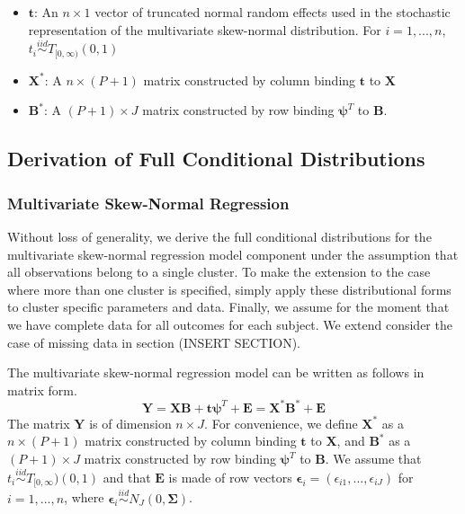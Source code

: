 \documentclass[useAMS,referee]{biom}
\begin{document}
\begin{itemize}
    \item $\mathbf{t}$: An $n \times 1$ vector of truncated normal random effects used in the stochastic representation of the multivariate skew-normal distribution. For $i = 1,...,n$, $t_i \stackrel{iid}{\sim}T_{[0,\infty)}(0,1)$
    
    \item $\mathbf{X}^*$: A $n \times (P + 1)$ matrix constructed by column binding $\mathbf{t}$ to $\mathbf{X}$
    
    \item $\mathbf{B}^*$: A $(P+1) \times J$ matrix constructed by row binding $\boldsymbol\psi^T$ to $\mathbf{B}$.

\end{itemize}

\newpage
\subsection{Derivation of Full Conditional Distributions}

\subsubsection{Multivariate Skew-Normal Regression}

Without loss of generality, we derive the full conditional distributions for the multivariate skew-normal regression model component under the assumption that all observations belong to a single cluster. To make the extension to the case where more than one cluster is specified, simply apply these distributional forms to cluster specific parameters and data. Finally, we assume for the moment that we have complete data for all outcomes for each subject. We extend consider the case of missing data in section (INSERT SECTION).

The multivariate skew-normal regression model can be written as follows in matrix form. 
$$\mathbf{Y} = \mathbf{X}\mathbf{B} + \mathbf{t} \boldsymbol\psi^T + \mathbf{E} = \mathbf{X}^* \mathbf{B}^* + \mathbf{E}$$
The matrix $\mathbf{Y}$ is of dimension $n \times J$. For convenience, we define $\mathbf{X}^*$ as a $n \times (P + 1)$ matrix constructed by column binding $\mathbf{t}$ to $\mathbf{X}$, and $\mathbf{B}^*$ as a $(P+1) \times J$ matrix constructed by row binding $\boldsymbol\psi^T$ to $\mathbf{B}$. We assume that $t_i \stackrel{iid}{\sim}T_{[0,\infty})(0,1)$ and that $\mathbf{E}$ is made of row vectors $\boldsymbol\epsilon_i = (\epsilon_{i1},...,\epsilon_{iJ})$ for $i = 1,...,n$, where $ \boldsymbol\epsilon_i \stackrel{iid}{\sim} N_J(0, \boldsymbol\Sigma)$.
\end{document}
